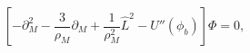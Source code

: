 \begin{equation}\left[-\partial_{M}^2-\frac{3}{\rho_{M}}\partial_{M}+\frac{1}{\rho_{M}^2}\hat{L}^2-U''(\phi_b)\right]\Phi=0,\label{1}\end{equation}

